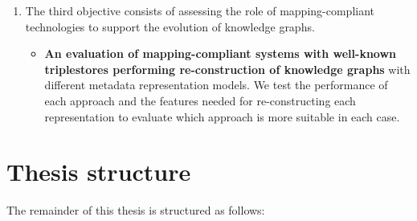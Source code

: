 \begin{enumerate}
    \item The third objective consists of assessing the role of mapping-compliant technologies to support the evolution of knowledge graphs.

    \begin{itemize}
        \item \textbf{An evaluation of mapping-compliant systems with well-known triplestores performing re-construction of knowledge graphs} with different metadata representation models. We test the performance of each approach and the features needed for re-constructing each representation to evaluate which approach is more suitable in each case. 
    \end{itemize}
\end{enumerate}


\section{Thesis structure}

The remainder of this thesis is structured as follows:

